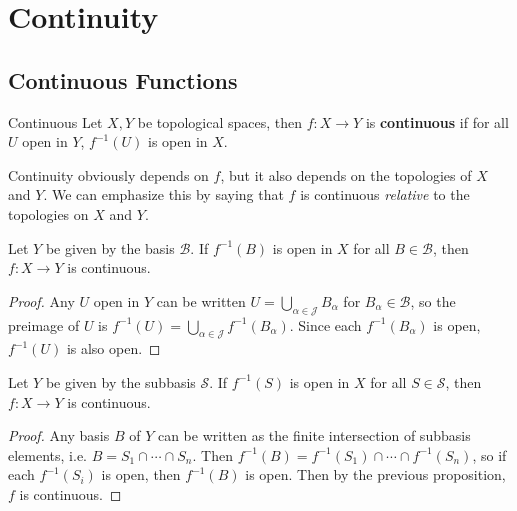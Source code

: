 \documentclass[10pt]{report}
\begin{document}

\chapter{Continuity}


\section{Continuous Functions}

\begin{defn}{Continuous}{}
	Let $X,Y$ be topological spaces, then $f : X \to Y$ is \textbf{continuous} if for all $U$ open in $Y$, $f^{-1}(U)$ is open in $X$.
\end{defn}

Continuity obviously depends on $f$, but it also depends on the topologies of $X$ and $Y$. We can emphasize this by saying that $f$ is continuous \textit{relative} to the topologies on  $X$ and $Y$.

\begin{prop}
	Let $Y$ be given by the basis $\mathcal{B}$. If $f^{-1}(B)$ is open in $X$ for all $B \in \mathcal{B}$, then $f: X \to Y$ is continuous.
\end{prop}
\begin{proof}
	Any $U$ open in $Y$ can be written $U = \bigcup_{\alpha\in\mathcal{J}} B_\alpha$ for $B_\alpha \in \mathcal{B}$, so the preimage of $U$ is $f^{-1}(U) = \bigcup_{\alpha\in\mathcal{J}} f^{-1}(B_\alpha)$. Since each $f^{-1}(B_\alpha)$ is open, $f^{-1}(U)$ is also open.
\end{proof}

\begin{prop}
	Let $Y$ be given by the subbasis $\mathcal{S}$. If $f^{-1}(S)$ is open in $X$ for all $S \in \mathcal{S}$, then $f: X \to Y$ is continuous.
\end{prop}
\begin{proof}
	Any basis $B$ of $Y$ can be written as the finite intersection of subbasis elements, i.e. $B = S_1 \cap \cdots \cap S_n$. Then $f^{-1}(B) = f^{-1}(S_1) \cap \cdots \cap f^{-1}(S_n)$, so if each $f^{-1}(S_i)$ is open, then $f^{-1}(B)$ is open. Then by the previous proposition, $f$ is continuous.
\end{proof}
\end{document}
